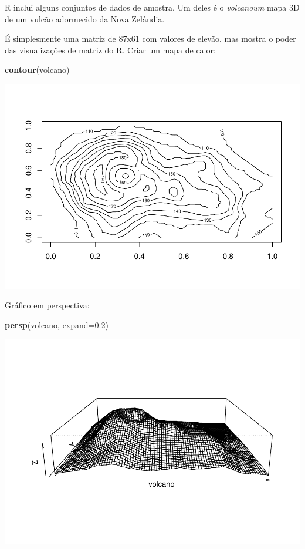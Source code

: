 \documentclass[]{book}
\newenvironment{Shaded}{\begin{snugshade}}{\end{snugshade}}
\newcommand{\DataTypeTok}[1]{\textcolor[rgb]{0.13,0.29,0.53}{#1}}
\newcommand{\FloatTok}[1]{\textcolor[rgb]{0.00,0.00,0.81}{#1}}
\newcommand{\KeywordTok}[1]{\textcolor[rgb]{0.13,0.29,0.53}{\textbf{#1}}}
\newcommand{\NormalTok}[1]{#1}
\begin{document}
R inclui alguns conjuntos de dados de amostra. Um deles é o \emph{volcanoum} mapa 3D de um vulcão adormecido da Nova Zelândia.

É simplesmente uma matriz de 87x61 com valores de elevão, mas mostra o poder das visualizações de matriz do R. Criar um mapa de calor:

\begin{Shaded}
\begin{Highlighting}[]
\KeywordTok{contour}\NormalTok{(volcano)}
\end{Highlighting}
\end{Shaded}

\includegraphics{TudodoR_files/figure-latex/unnamed-chunk-74-1.pdf}

Gráfico em perspectiva:

\begin{Shaded}
\begin{Highlighting}[]
\KeywordTok{persp}\NormalTok{(volcano, }\DataTypeTok{expand=}\FloatTok{0.2}\NormalTok{)}
\end{Highlighting}
\end{Shaded}

\includegraphics{TudodoR_files/figure-latex/unnamed-chunk-75-1.pdf}
\end{document}
